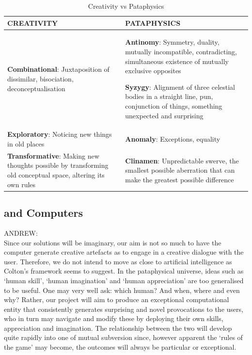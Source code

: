 \begin{table}[htb]
  \begin{tabu}{XX}
  \toprule
  \textbf{CREATIVITY}
  &
  \textbf{PATAPHYSICS}
  \\ \midrule
  \textbf{Combinational}: Juxtaposition of dissimilar, bisociation, deconceptualisation
  &
  \textbf{Antinomy}: Symmetry, duality, mutually incompatible, contradicting, simultaneous existence of mutually exclusive opposites
  \par
  \textbf{Syzygy}: Alignment of three celestial bodies in a
  straight line, pun, conjunction of things, something unexpected
  and surprising
  \\ \midrule
  \textbf{Exploratory}: Noticing new things in old places
  &
  \textbf{Anomaly}: Exceptions, equality
  \\ \midrule
  \textbf{Transformative}: Making new thoughts possible by transforming old conceptual space, altering its own rules
  &
  \textbf{Clinamen}: Unpredictable swerve, the smallest possible aberration that can make the greatest possible difference
  \\
  \bottomrule
  \end{tabu}
\caption[Creativity vs Pataphysics]{Creativity vs Pataphysics}
\label{tab:creatpata}
\end{table}


\subsection{and Computers}

\begin{draft}
  ANDREW:\\
  Since our solutions will be imaginary, our aim is not so much to have the computer generate creative artefacts as to engage in a creative dialogue with the user. Therefore, we do not intend to move as close to artificial intelligence as Colton's framework seems to suggest. In the pataphysical universe, ideas such as `human skill', `human imagination' and `human appreciation' are too generalised to be useful. One may very well ask: which human? And when, where and even why? Rather, our project will aim to produce an exceptional computational entity that consistently generates surprising and novel provocations to the users, who in turn may navigate and modify these by deploying their own skills, appreciation and imagination. The relationship between the two will develop quite rapidly into one of mutual subversion since, however apparent the `rules of the game' may become, the outcomes will always be particular or exceptional.
\end{draft}

